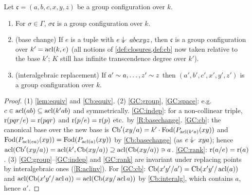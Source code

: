 \begin{lemma}[invariance]\label{lem:gc-invariance}
Let $\mathfrak c=(a,b,c,x,y,z)$ be a group configuration over $k$.
\begin{enumerate}[nosep]
\item For $\sigma\in\Gamma$, $\sigma\mathfrak c$ is a group configuration over $k$.
\item (base change) If $e$ is a tuple with $e\ind{}abcxyz$, then $\mathfrak c$ is a group
  configuration over $k'=\operatorname{acl}(k,e)$ (all notions of
  \cref{def:closures,def:cb} now taken relative to the base $k'$; $K$ still has
  infinite transcendence degree over $k'$).
\item (interalgebraic replacement) If $a'\sim a,\dots,z'\sim z$ then
  $(a',b',c',x',y',z')$ is a group configuration over $k$.
\end{enumerate}
\end{lemma}
\begin{proof}
(1) \cref{lem:equiv} and \ref{Cb:equiv}.
(2) \ref{GC:group}, \ref{GC:space}: e.g.\ $c\in\operatorname{acl}(ab)\subseteq\operatorname{acl}(k'ab)$ and
symmetrically.  \ref{GC:indep}: for a non-collinear triple, $\operatorname{r}(pqr/e)=\operatorname{r}(pqr)$ and
$\operatorname{r}(p/e)=\operatorname{r}(p)$ etc.\ by \ref{R:basechange}.  \ref{GC:cb}: the canonical base over the
new base is $\operatorname{Cb}'(xy/a)=k'\cdot\operatorname{Fod}(P_{\operatorname{acl}(k'a)}(xy))$ and
$\operatorname{Fod}(P_{\operatorname{acl}(ea)}(xy))=\operatorname{Fod}(P_{\operatorname{acl}(a)}(xy))$ by \ref{Cb:basechange} (as
$e\ind{}xya$); hence $\operatorname{acl}(\operatorname{Cb}'(xy/a))=\operatorname{acl}(k',\operatorname{Cb}(xy/a))\supseteq\operatorname{acl}(\operatorname{Cb}(xy/a))\ni a$.
\ref{GC:rank}: $\operatorname{r}(a/e)=\operatorname{r}(a)$.
(3) \ref{GC:group}--\ref{GC:indep} and \ref{GC:rank} are invariant under replacing
points by interalgebraic ones (\ref{R:aclinv}).  For \ref{GC:cb}:
$\operatorname{Cb}(x'y'/a')=\operatorname{Cb}(x'y'/\operatorname{acl}(a))$ and $\operatorname{acl}(\operatorname{Cb}(x'y'/\operatorname{acl} a))=\operatorname{acl}(\operatorname{Cb}(xy/\operatorname{acl} a))$ by
\ref{Cb:interalg}, which contains $a$, hence $a'$.
\end{proof}


